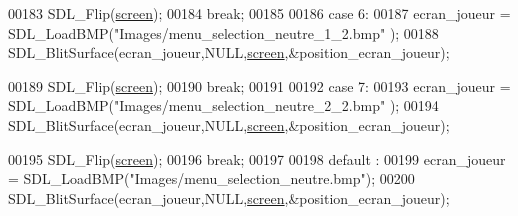 \begin{DoxyCode}
00183                 SDL\_Flip(\hyperlink{fonction_interface_8h_a78fa3957d73de49cb81d047857504218}{screen});
00184                 \textcolor{keywordflow}{break};
00185 
00186         \textcolor{keywordflow}{case} 6:
00187                 ecran\_joueur = SDL\_LoadBMP(\textcolor{stringliteral}{"Images/menu\_selection\_neutre\_1\_2.bmp"
      });
00188                 SDL\_BlitSurface(ecran\_joueur,NULL,\hyperlink{fonction_interface_8h_a78fa3957d73de49cb81d047857504218}{screen},&position\_ecran\_joueur);
      
00189                 SDL\_Flip(\hyperlink{fonction_interface_8h_a78fa3957d73de49cb81d047857504218}{screen});
00190                 \textcolor{keywordflow}{break};
00191 
00192         \textcolor{keywordflow}{case} 7:
00193                 ecran\_joueur = SDL\_LoadBMP(\textcolor{stringliteral}{"Images/menu\_selection\_neutre\_2\_2.bmp"
      });
00194                 SDL\_BlitSurface(ecran\_joueur,NULL,\hyperlink{fonction_interface_8h_a78fa3957d73de49cb81d047857504218}{screen},&position\_ecran\_joueur);
      
00195                 SDL\_Flip(\hyperlink{fonction_interface_8h_a78fa3957d73de49cb81d047857504218}{screen});
00196                 \textcolor{keywordflow}{break};
00197 
00198         \textcolor{keywordflow}{default} :
00199                 ecran\_joueur = SDL\_LoadBMP(\textcolor{stringliteral}{"Images/menu\_selection\_neutre.bmp"});
00200                 SDL\_BlitSurface(ecran\_joueur,NULL,\hyperlink{fonction_interface_8h_a78fa3957d73de49cb81d047857504218}{screen},&position\_ecran\_joueur);
      

\end{DoxyCode}
